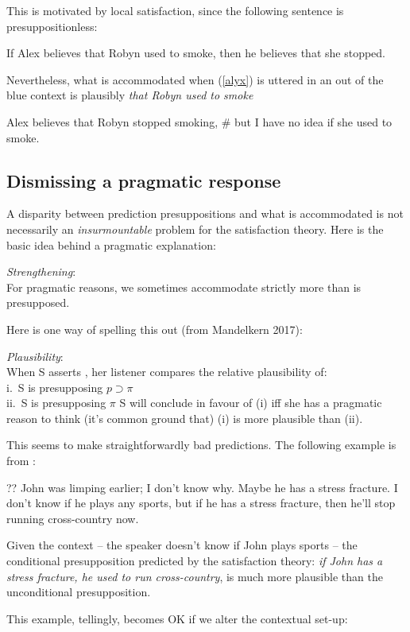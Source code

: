 \documentclass[nols,twoside,nofonts,nobib,nohyper]{tufte-handout}
\begin{document}
This is motivated by local satisfaction, since the following sentence is presuppositionless:

\ex
If Alex believes that Robyn used to smoke, then he believes that she stopped.
\xe

Nevertheless, what is accommodated when (\ref{alyx}) is uttered in an out of the blue context is plausibly \textit{that Robyn used to smoke}

\ex
Alex believes that Robyn stopped smoking, \# but I have no idea if she used to smoke.
\xe

\subsection{Dismissing a pragmatic response}


A disparity between prediction presuppositions and what is accommodated is not necessarily an \textit{insurmountable} problem for the satisfaction theory. Here is the basic idea behind a pragmatic explanation:

\ex
\textit{Strengthening}:\\
For pragmatic reasons, we sometimes accommodate strictly more than is presupposed.
\xe

Here is one way of spelling this out (from Mandelkern 2017):

\pex
\textit{Plausibility}:\\
\a When S asserts , her listener compares the relative plausibility of:\\
i. S is presupposing \(p ⊃ π\)\\
ii. S is presupposing \(π\)
\a S will conclude in favour of (i) iff she has a pragmatic reason to think (it's common ground that) (i) is more plausible than (ii).
\xe

This seems to make straightforwardly bad predictions. The following example is from \citet{mandelkern2016}:

\ex
?? John was limping earlier; I don't know why. Maybe he has a stress fracture. I don't know if he plays any sports, but if he has a stress fracture, then he'll stop running cross-country now.
\xe

Given the context -- the speaker doesn't know if John plays sports -- the conditional presupposition predicted by the satisfaction theory: \textit{if John has a stress fracture, he used to run cross-country}, is much more plausible than the unconditional presupposition.

This example, tellingly, becomes OK if we alter the contextual set-up:
\end{document}
